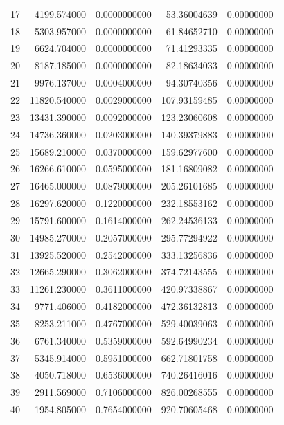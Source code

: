 \begin{center}
\begin{xtabular}{|r||rr||rr|}
17 &  4199.574000  & 0.0000000000 &       53.36004639 & 0.00000000 \\
18 &  5303.957000  & 0.0000000000 &       61.84652710 & 0.00000000 \\
19 &  6624.704000  & 0.0000000000 &       71.41293335 & 0.00000000 \\
20 &  8187.185000  & 0.0000000000 &       82.18634033 & 0.00000000 \\
21 &  9976.137000  & 0.0004000000 &       94.30740356 & 0.00000000 \\
22 & 11820.540000  & 0.0029000000 &      107.93159485 & 0.00000000 \\
23 & 13431.390000  & 0.0092000000 &      123.23060608 & 0.00000000 \\
24 & 14736.360000  & 0.0203000000 &      140.39379883 & 0.00000000 \\
25 & 15689.210000  & 0.0370000000 &      159.62977600 & 0.00000000 \\
26 & 16266.610000  & 0.0595000000 &      181.16809082 & 0.00000000 \\
27 & 16465.000000  & 0.0879000000 &      205.26101685 & 0.00000000 \\
28 & 16297.620000  & 0.1220000000 &      232.18553162 & 0.00000000 \\
29 & 15791.600000  & 0.1614000000 &      262.24536133 & 0.00000000 \\
30 & 14985.270000  & 0.2057000000 &      295.77294922 & 0.00000000 \\
31 & 13925.520000  & 0.2542000000 &      333.13256836 & 0.00000000 \\
32 & 12665.290000  & 0.3062000000 &      374.72143555 & 0.00000000 \\
33 & 11261.230000  & 0.3611000000 &      420.97338867 & 0.00000000 \\
34 &  9771.406000  & 0.4182000000 &      472.36132813 & 0.00000000 \\
35 &  8253.211000  & 0.4767000000 &      529.40039063 & 0.00000000 \\ 
36 &  6761.340000  & 0.5359000000 &      592.64990234 & 0.00000000 \\
37 &  5345.914000  & 0.5951000000 &      662.71801758 & 0.00000000 \\
38 &  4050.718000  & 0.6536000000 &      740.26416016 & 0.00000000 \\
39 &  2911.569000  & 0.7106000000 &      826.00268555 & 0.00000000 \\
40 &  1954.805000  & 0.7654000000 &      920.70605468 & 0.00000000 \\

\end{xtabular}
\end{center}
